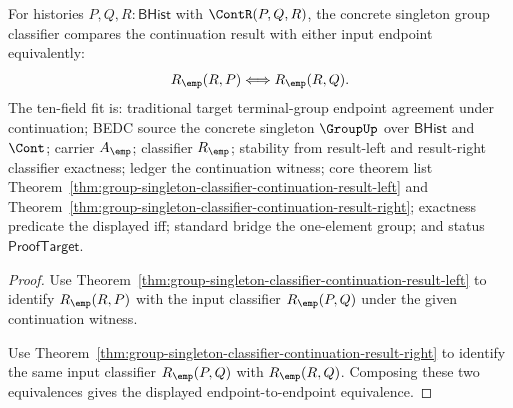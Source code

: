 \begin{theorem}
\label{thm:group-singleton-continuation-result-endpoint-equivalence}
For histories $P,Q,R:\mathsf{BHist}$ with $\ContR(P,Q,R)$, the concrete
singleton group classifier compares the continuation result with either input
endpoint equivalently:
$$
R_{\emp}(R,P)\Longleftrightarrow R_{\emp}(R,Q).
$$
The ten-field fit is: traditional target terminal-group endpoint agreement
under continuation; BEDC source the concrete singleton $\GroupUp$ over
$\mathsf{BHist}$ and $\Cont$; carrier $A_{\emp}$; classifier $R_{\emp}$;
stability from result-left and result-right classifier exactness; ledger the
continuation witness; core theorem list
Theorem~\ref{thm:group-singleton-classifier-continuation-result-left} and
Theorem~\ref{thm:group-singleton-classifier-continuation-result-right};
exactness predicate the displayed iff; standard bridge the one-element group;
and status $\mathsf{ProofTarget}$.
\end{theorem}
\begin{proof}
Use Theorem~\ref{thm:group-singleton-classifier-continuation-result-left} to
identify $R_{\emp}(R,P)$ with the input classifier $R_{\emp}(P,Q)$ under the
given continuation witness.

Use Theorem~\ref{thm:group-singleton-classifier-continuation-result-right} to
identify the same input classifier $R_{\emp}(P,Q)$ with $R_{\emp}(R,Q)$.
Composing these two equivalences gives the displayed endpoint-to-endpoint
equivalence.
\end{proof}

